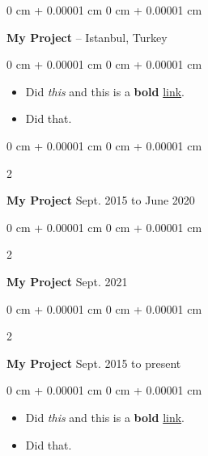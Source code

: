 \documentclass[10pt, letterpaper]{article}
\newenvironment{highlights}{
    \begin{itemize}[
        topsep=0.10 cm,
        parsep=0.10 cm,
        partopsep=0pt,
        itemsep=0pt,
        leftmargin=0 cm + 10pt
    ]
}{
    \end{itemize}
        
    \vspace{-0.10cm}
} %
\newenvironment{onecolentry}{
    \begin{adjustwidth}{
        0 cm + 0.00001 cm
    }{
        0 cm + 0.00001 cm
    }
}{
    \end{adjustwidth}
} %
\newenvironment{twocolentry}[2][]{
    \onecolentry
    \def\secondColumn{#2}
    \setcolumnwidth{\fill, 4.1 cm}
    \begin{paracol}{2}
}{
    \switchcolumn \raggedleft \secondColumn
    \end{paracol}
    \endonecolentry
} %
\begin{document}
        \vspace{0.10 cm}


        \vspace{0.15 cm}

        \begin{onecolentry}
            \textbf{My Project} -- Istanbul, Turkey\end{onecolentry}

        \vspace{0.10 cm}
        \begin{onecolentry}
            \begin{highlights}
                \item Did \textit{this} and this is a \textbf{bold} \href{https://example.com}{link}.
                \item Did that.
            \end{highlights}
        \end{onecolentry}


        \vspace{0.15 cm}

        \begin{twocolentry}{
            Sept. 2015 to June 2020
        }
            \textbf{My Project}\end{twocolentry}

        \vspace{0.10 cm}


        \vspace{0.15 cm}

        \begin{twocolentry}{
            Sept. 2021
        }
            \textbf{My Project}\end{twocolentry}

        \vspace{0.10 cm}


        \vspace{0.15 cm}

        \begin{twocolentry}{
            Sept. 2015 to present
        }
            \textbf{My Project}\end{twocolentry}

        \vspace{0.10 cm}
        \begin{onecolentry}
            \begin{highlights}
                \item Did \textit{this} and this is a \textbf{bold} \href{https://example.com}{link}.
                \item Did that.
            \end{highlights}
        \end{onecolentry}
\end{document}
